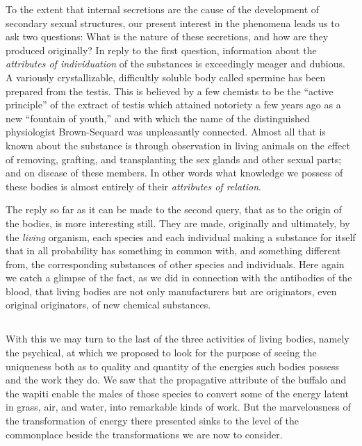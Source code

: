 \documentclass[a4paper, 11pt, oneside, polutonikogreek, english]{article}
\begin{document}
To the extent that internal secretions are the cause of the development of secondary sexual structures, our present interest in the phenomena leads us to ask two questions: What is the nature of these secretions, and how are they produced originally? In reply to the first question, information about the \emph{attributes of individuation} of the substances is exceedingly meager and dubious. A variously crystallizable, difficultly soluble body called spermine has been prepared from the testis. This is believed by a few chemists to be the ``active principle'' of the extract of testis which attained notoriety a few years ago as a new ``fountain of youth,'' and with which the name of the distinguished physiologist Brown-Sequard was unpleasantly connected. Almost all that is known about the substance is through observation in living animals on the effect of removing, grafting, and transplanting the sex glands and other sexual parts; and on disease of these members. In other words what knowledge we possess of these bodies is almost entirely of their \emph{attributes of relation}.

The reply so far as it can be made to the second query, that as to the origin of the bodies, is more interesting still. They are made, originally and ultimately, by the \emph{living} organism, each species and each individual making a substance for itself that in all probability has something in common with, and something different from, the corresponding substances of other species and individuals. Here again we catch a glimpse of the fact, as we did in connection with the antibodies of the blood, that living bodies are not only manufacturers but are originators, even original originators, of new chemical substances.

\subsection{}
\paragraph{}
With this we may turn to the last of the three activities of living bodies, namely the psychical, at which we proposed to look for the purpose of seeing the uniqueness both as to quality and quantity of the energies such bodies possess and the work they do. We saw that the propagative attribute of the buffalo and the wapiti enable the males of those species to convert some of the energy latent in grass, air, and water, into remarkable kinds of work. But the marvelousness of the transformation of energy there presented sinks to the level of the commonplace beside the transformations we are now to consider.
\end{document}
